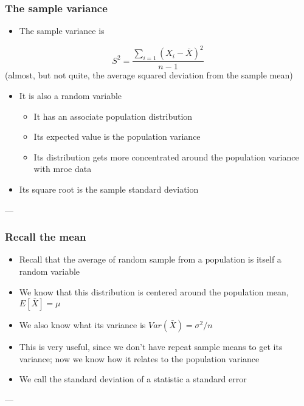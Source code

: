 \documentclass[10pt,article]{article}
\begin{document}
\subsubsection{The sample variance}
\label{sec:org5a4ee0c}
\begin{itemize}
\item The sample variance is
\end{itemize}
$$
S^2 = \frac{\sum_{i=1} (X_i - \bar X)^2}{n-1}
$$
(almost, but not quite, the average squared deviation from
the sample mean)
\begin{itemize}
\item It is also a random variable
\begin{itemize}
\item It has an associate population distribution
\item Its expected value is the population variance
\item Its distribution gets more concentrated around the population variance with mroe data
\end{itemize}
\item Its square root is the sample standard deviation
\end{itemize}


---
\subsubsection{Recall the mean}
\label{sec:orga4f29b6}
\begin{itemize}
\item Recall that the average of random sample from a population is itself a random variable
\item We know that this distribution is centered around the population mean, \(E[\bar X] = \mu\)
\item We also know what its variance is \(Var(\bar X) = \sigma^2 / n\)
\item This is very useful, since we don't have repeat sample means to get its variance; now we know how it relates to the population variance
\item We call the standard deviation of a statistic a standard error
\end{itemize}

---
\end{document}
